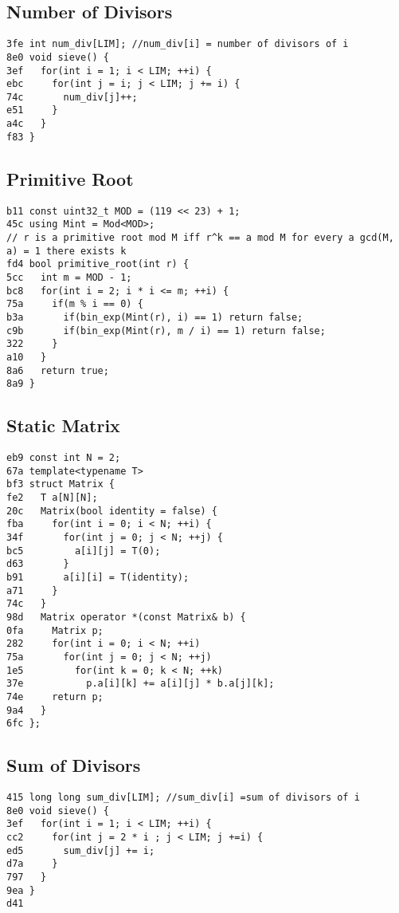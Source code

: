 \documentclass[10pt, a4paper, twoside]{article}
\begin{document}
\subsection{Number of Divisors
}
\begin{lstlisting}
3fe int num_div[LIM]; //num_div[i] = number of divisors of i
8e0 void sieve() {
3ef   for(int i = 1; i < LIM; ++i) {
ebc     for(int j = i; j < LIM; j += i) {
74c       num_div[j]++;
e51     }
a4c   }
f83 }
\end{lstlisting}

\subsection{Primitive Root}
\begin{lstlisting}
b11 const uint32_t MOD = (119 << 23) + 1;
45c using Mint = Mod<MOD>;
// r is a primitive root mod M iff r^k == a mod M for every a gcd(M, a) = 1 there exists k
fd4 bool primitive_root(int r) {
5cc   int m = MOD - 1;
bc8   for(int i = 2; i * i <= m; ++i) {
75a     if(m % i == 0) {
b3a       if(bin_exp(Mint(r), i) == 1) return false;
c9b       if(bin_exp(Mint(r), m / i) == 1) return false;
322     }
a10   }
8a6   return true;
8a9 }
\end{lstlisting}

\subsection{Static Matrix}
\begin{lstlisting}
eb9 const int N = 2;
67a template<typename T>
bf3 struct Matrix {
fe2   T a[N][N];
20c   Matrix(bool identity = false) {
fba     for(int i = 0; i < N; ++i) {
34f       for(int j = 0; j < N; ++j) {
bc5         a[i][j] = T(0);
d63       }
b91       a[i][i] = T(identity);
a71     }
74c   }
98d   Matrix operator *(const Matrix& b) {
0fa     Matrix p;
282     for(int i = 0; i < N; ++i)
75a       for(int j = 0; j < N; ++j)
1e5         for(int k = 0; k < N; ++k)
37e           p.a[i][k] += a[i][j] * b.a[j][k];
74e     return p;
9a4   }
6fc };
\end{lstlisting}

\subsection{Sum of Divisors
}
\begin{lstlisting}
415 long long sum_div[LIM]; //sum_div[i] =sum of divisors of i
8e0 void sieve() {
3ef   for(int i = 1; i < LIM; ++i) {
cc2     for(int j = 2 * i ; j < LIM; j +=i) {
ed5       sum_div[j] += i;
d7a     }
797   }
9ea }
d41 
\end{lstlisting}
\end{document}

